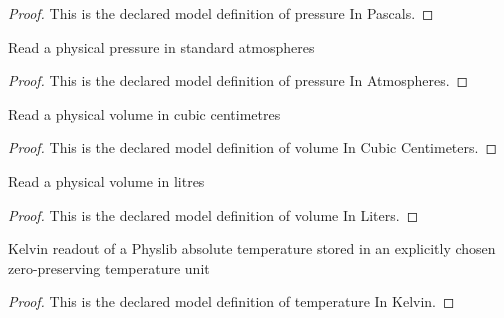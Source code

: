 \begin{proof}
  This is the declared model definition of pressure In Pascals.
\end{proof}
\begin{definition}
  \label{def:physics:phyx-mini-0371:phyxminiproblems-problemphyxmini0371-pressureinatmospheres}
  Read a physical pressure in standard atmospheres
\end{definition}
\begin{proof}
  This is the declared model definition of pressure In Atmospheres.
\end{proof}
\begin{definition}
  \label{def:physics:phyx-mini-0371:phyxminiproblems-problemphyxmini0371-volumeincubiccentimeters}
  Read a physical volume in cubic centimetres
\end{definition}
\begin{proof}
  This is the declared model definition of volume In Cubic Centimeters.
\end{proof}
\begin{definition}
  \label{def:physics:phyx-mini-0371:phyxminiproblems-problemphyxmini0371-volumeinliters}
  Read a physical volume in litres
\end{definition}
\begin{proof}
  This is the declared model definition of volume In Liters.
\end{proof}
\begin{definition}
  \label{def:physics:phyx-mini-0371:phyxminiproblems-problemphyxmini0371-temperatureinkelvin}
  Kelvin readout of a Physlib absolute temperature stored in an explicitly chosen zero-preserving temperature unit
\end{definition}
\begin{proof}
  This is the declared model definition of temperature In Kelvin.
\end{proof}
